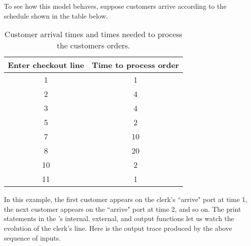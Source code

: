 To see how this model behaves, suppose customers arrive according to the schedule shown in the table below.
\begin{table}
\centering
\begin{tabular}{|c|c|}
\hline
Enter checkout line & Time to process order \\ \hline
1 & 1 \\ \hline
2 & 4 \\ \hline
3 & 4 \\ \hline
5 & 2 \\ \hline
7 & 10 \\ \hline
8 & 20 \\ \hline
10 & 2 \\ \hline
11 & 1 \\ \hline
\end{tabular}
\caption{Customer arrival times and times needed to process the customers orders.}
\label{tab:customer_data}
\end{table}
In this example, the first customer appears on the clerk's ``arrive" port at time 1, the next customer appears on the ``arrive" port at time 2, and so on. The print statements in the 's internal, external, and output functions let us watch the evolution of the clerk's line. Here is the output trace produced by the above sequence of inputs.
